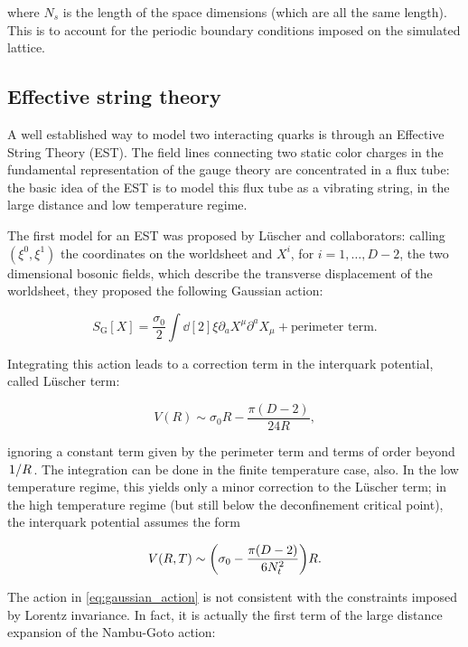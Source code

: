 \documentclass[reqno,12pt]{article}
\numberwithin{equation}{section}
\begin{document}
where $N_s$ is the length of the space dimensions (which are all the same length). This is to account for the periodic boundary conditions
imposed on the simulated lattice.

\subsection{Effective string theory} \label{est}

A well established way to model two interacting quarks is through an Effective String Theory (EST). The field lines connecting
two static color charges in the fundamental representation of the gauge theory are concentrated in a flux tube: the basic
idea of the EST is to model this flux tube as a vibrating string, in the large distance and low temperature regime.

The first model for an EST was proposed by L{\"u}scher and collaborators: calling $(\xi^0, \xi^1)$ the coordinates
on the worldsheet and $X^i$, for $i = 1, \dots, D - 2$, the two dimensional bosonic fields, which describe the transverse
displacement of the worldsheet, they proposed the following Gaussian action:

\begin{equation} \label{eq:gaussian_action}
	S_\text{G}[X] = \frac{\sigma_0}{2} \int \dd[2]{\xi} \partial_a X^\mu \partial^a X_\mu + \text{perimeter term.}
\end{equation} 

Integrating this action leads to a correction term in the interquark potential, called L{\"u}scher term:

\begin{equation}
	V(R) \sim \sigma_0 R - \frac{\pi(D-2)}{24R},
\end{equation}

ignoring a constant term given by the perimeter term and terms of order beyond $\flatfrac{1}{R}$. The integration
can be done in the finite temperature case, also. In the low temperature regime, this yields only a minor correction
to the L{\"u}scher term; in the high temperature regime (but still below the deconfinement critical point), the interquark
potential assumes the form \cite{caselle}

\begin{equation}
	V(R, T) \sim \qty(\sigma_0 - \frac{\pi(D - 2)}{6N_t^2})R.
\end{equation}

The action in \eqref{eq:gaussian_action} is not consistent with the constraints imposed by Lorentz invariance. In fact,
it is actually the first term of the large distance expansion of the Nambu-Goto action:
\end{document}
